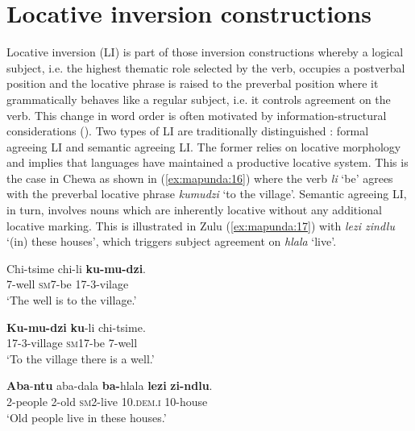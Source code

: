 \documentclass[output=paper ]{langscibook}
\begin{document}
\section{Locative inversion constructions}\label{sec:mapunda:4}

Locative inversion (LI) is part of those inversion constructions whereby a logical subject, i.e. the highest thematic role selected by the verb, occupies a postverbal position and the locative phrase is raised to the preverbal position where it grammatically behaves like a regular subject, i.e. it controls agreement on the verb. This change in word order is often motivated by information-structural considerations (\citealt{MartenvanderWal2014, HamlaouiForthcoming}). Two types of LI are traditionally distinguished \citep{Buell2007}: formal agreeing LI and semantic agreeing LI. The former relies on locative morphology and implies that languages have maintained a productive locative system. This is the case in Chewa as shown in (\ref{ex:mapunda:16}) where the verb \textit{li} ‘be’ agrees with the preverbal locative phrase \textit{kumudzi} ‘to the village’. Semantic agreeing LI, in turn, involves nouns which are inherently locative without any additional locative marking. This is illustrated in Zulu (\ref{ex:mapunda:17}) with \textit{lezi zindlu} ‘(in) these houses’, which triggers subject agreement on \textit{hlala} ‘live’. 


\ea 
\label{ex:mapunda:16}
    \ea\label{ex:mapunda:16a} \gll  Chi-tsime  chi-li    \textbf{ku-mu-dzi}. \\
                                     7-well  \textsc{sm7}{}-be    17-3-vilage\\   \jambox*{[Chewa]}
                                \glt ‘The well is to the village.’

    \ex\label{ex:mapunda:16b} \gll  \textbf{Ku-mu-dzi}    \textbf{ku}{}-li    chi-tsime.\\
                          17-3-village    \textsc{sm17}{}-be  7-well\\
                            \glt  ‘To the village there is a well.’ \citep[5]{Salzman2005}
    \z

\ex 
\label{ex:mapunda:17}
    \ea\label{ex:mapunda:17a} \gll  \textbf{Aba}{}-\textbf{ntu}    aba-dala  \textbf{ba-}hlala        \textbf{lezi}        \textbf{zi-ndlu}. \\ 
                                     2-people      2-old    \textsc{sm2}{}-live          10.\textsc{dem.i}  10-house\\ \jambox*{[Zulu]}
                         \glt ‘Old people live in these houses.’ 
\end{document}
